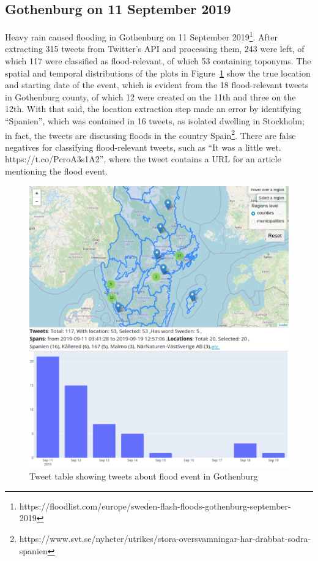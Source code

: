 \subsection{Gothenburg on 11 September 2019}
Heavy rain caused flooding in Gothenburg on 11 September
2019\footnote{https://floodlist.com/europe/sweden-flash-floods-gothenburg-september-2019}.
After extracting 315 tweets from Twitter's API and
processing them, 243 were left, of which 117 were classified as flood-relevant, of which 53
containing toponyms. The spatial and temporal distributions of the plots in
Figure~\ref{fig:gothenburg_map}
show the true location and starting date of the event, which is evident from the 18 flood-relevant tweets in Gothenburg county, of which 12 were created on the
11th and three on the 12th. With that said, the location extraction step made an error by
identifying ``Spanien'', which was contained in 16 tweets, as isolated dwelling in Stockholm; in
fact, the tweets are discussing floods in the country
Spain\footnote{https://www.svt.se/nyheter/utrikes/stora-oversvamningar-har-drabbat-sodra-spanien}. 
There are false negatives for classifying flood-relevant tweets, such as ``It was a little
wet. https://t.co/PcroA3s1A2'', where the tweet contains a \ac{URL} for an article mentioning the
flood event.

\begin{figure}[H]
  \begin{center}
    \includegraphics[width=12cm]{./images/gothenburg_floods.png}
  \end{center}
  \caption{Tweet table  showing tweets about flood event in Gothenburg}
  \label{fig:gothenburg_map}
\end{figure}

